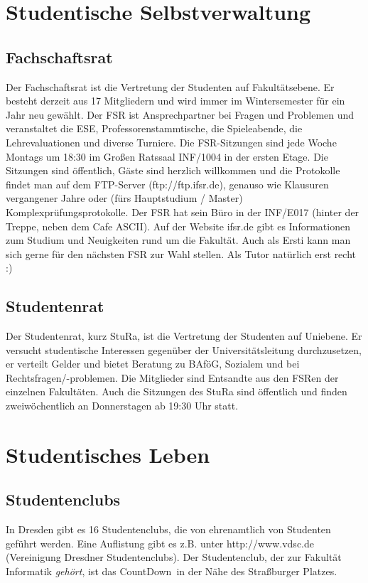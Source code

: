 \documentclass[a4paper,12pt]{report}
\begin{document}
\section{Studentische Selbstverwaltung}
\subsection{Fachschaftsrat}
Der Fachschaftsrat ist die Vertretung der Studenten auf Fakultätsebene.
Er besteht derzeit aus 17 Mitgliedern und wird immer im Wintersemester für ein Jahr neu gewählt.
Der FSR ist Ansprechpartner bei Fragen und Problemen und veranstaltet die ESE, Professorenstammtische, die Spieleabende, die Lehrevaluationen und diverse Turniere.
Die FSR-Sitzungen sind jede Woche Montags um 18:30 im Großen Ratssaal INF/1004 in der ersten Etage.
Die Sitzungen sind öffentlich, Gäste sind herzlich willkommen und die Protokolle findet man auf dem FTP-Server (ftp://ftp.ifsr.de), genauso wie Klausuren vergangener Jahre oder (fürs Hauptstudium / Master) Komplexprüfungsprotokolle.
Der FSR hat sein Büro in der INF/E017 (hinter der Treppe, neben dem Cafe ASCII).
Auf der Website ifsr.de gibt es Informationen zum Studium und Neuigkeiten rund um die Fakultät.
Auch als Ersti kann man sich gerne für den nächsten FSR zur Wahl stellen. Als Tutor natürlich erst recht :)

\subsection{Studentenrat}
Der Studentenrat, kurz StuRa, ist die Vertretung der Studenten auf Uniebene.
Er versucht studentische Interessen gegenüber der Universitätsleitung durchzusetzen, er verteilt Gelder und bietet Beratung zu BAföG, Sozialem und bei Rechtsfragen/-problemen.
Die Mitglieder sind Entsandte aus den FSRen der einzelnen Fakultäten.
Auch die Sitzungen des StuRa sind öffentlich und finden zweiwöchentlich an Donnerstagen ab 19:30 Uhr statt.

\section{Studentisches Leben}
\subsection{Studentenclubs}
In Dresden gibt es 16 Studentenclubs, die von ehrenamtlich von Studenten geführt werden.
Eine Auflistung gibt es z.B. unter http://www.vdsc.de (Vereinigung Dresdner Studentenclubs).
Der Studentenclub, der zur Fakultät Informatik \textit{gehört}, ist das \glqq CountDown\grqq\ in der Nähe des Straßburger Platzes.
\end{document}
